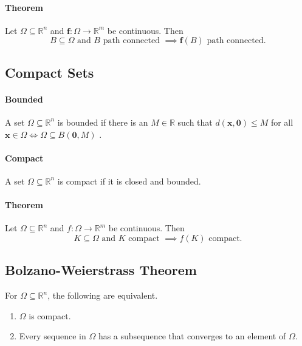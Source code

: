 \paragraph{Theorem} Let \(\Omega \subseteq \mathbb{R}^n\) and 
\(\textbf{f}: \Omega \rightarrow \mathbb{R}^m\) be continuous. Then
\[
    B \subseteq \Omega \text{ and } B \text{ path connected } \implies \textbf{f}(B)
    \text{ path connected}.
\]

\subsection{Compact Sets}
\paragraph{Bounded} A set \(\Omega \subseteq \mathbb{R}^n\) is bounded if there is
an \(M \in \mathbb{R}\) such that \(d(\textbf{x}, \textbf{0}) \leq M\) for all 
\(\textbf{x} \in \Omega \Longleftrightarrow \Omega \subseteq B(\textbf{0}, M)\) .

\paragraph{Compact} A set \(\Omega \subseteq \mathbb{R}^n\) is compact if it is closed
and bounded.

\paragraph{Theorem} Let \(\Omega \subseteq \mathbb{R}^n\) and 
\(f: \Omega \rightarrow \mathbb{R}^m\) be continuous. Then
\[
    K \subseteq \Omega \text{ and } K \text{ compact } \implies f(K) \text{ compact.}
\]

\subsection{Bolzano-Weierstrass Theorem}
For \(\Omega \subseteq \mathbb{R}^n\), the following are equivalent.
\begin{enumerate}
    \item \(\Omega\) is compact.
    \item Every sequence in \(\Omega\) has a subsequence that converges to an element of 
    \(\Omega\). 
\end{enumerate}
